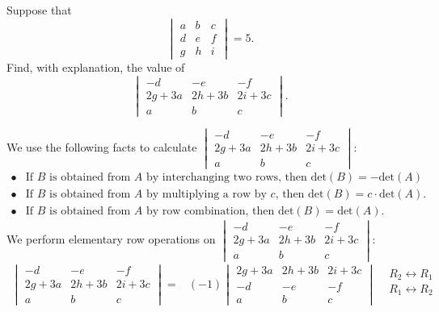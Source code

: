 \documentclass[12pt]{article}
\newenvironment{problem}[2][Problem]
{
	\begin{trivlist} 
		\item[\hskip \labelsep {\bfseries #1 #2:}]
	}
{
	\end{trivlist}
	}
\newenvironment{solution}[1][Solution]
{
	\begin{trivlist} 
		\item[\hskip \labelsep {\itshape #1:}]
	}
	{
	\end{trivlist}
}
\begin{document}
\newpage
\begin{problem}{2}
Suppose that
\[
\begin{vmatrix} a&b&c\\d&e&f\\g&h&i \end{vmatrix} = 5\text{.}
\]
Find, with explanation, the value of
\[
\begin{vmatrix} -d&-e&-f\\2g+3a&2h+3b&2i+3c\\a&b&c \end{vmatrix}\text{.}
\]
\noindent
\newline
\newline
\begin{solution}
We use the following facts to calculate $\begin{vmatrix} -d&-e&-f\\2g+3a&2h+3b&2i+3c\\a&b&c \end{vmatrix}$:
\begin{align*}
\bullet& \text{If $B$ is obtained from $A$ by interchanging two rows, then $\text{det}(B)=-\text{det}(A)$}.\\
\bullet& \text{If $B$ is obtained from $A$ by multiplying a row by $c$, then $\text{det}(B)=c\cdot \text{det}(A)$.}\\
\bullet& \text{If $B$ is obtained from $A$ by row combination, then $\text{det}(B)=\text{det}(A)$.}
\end{align*}
We perform elementary row operations on $\begin{vmatrix} -d&-e&-f\\2g+3a&2h+3b&2i+3c\\a&b&c \end{vmatrix}$:
\begin{align*}
\begin{vmatrix}  -d&-e&-f\\2g+3a&2h+3b&2i+3c\\a&b&c \end{vmatrix} =& (-1) \begin{vmatrix}2g+3a&2h+3b&2i+3c\\ -d&-e&-f\\a&b&c \end{vmatrix} & \begin{matrix} R_2 \leftrightarrow R_1 \text{} \\ R_1 \leftrightarrow R_2 \text{} \\  \text{} \end{matrix} \\

\end{align*}
\end{solution}
\end{problem}
\end{document}
